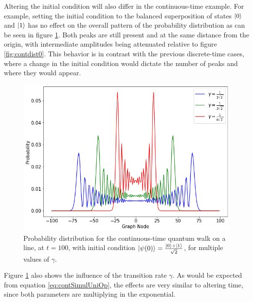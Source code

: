 \documentclass[../../dissertation.tex]{subfiles}
\begin{document}
Altering the initial condition will also differ in the
continuous-time example. For example, setting the initial condition to the
balanced superposition of states $\ket{0}$ and $\ket{1}$ has no effect on the
overall pattern of the probability distribution as can be seen in figure
\ref{fig:contdist2}. Both peaks are still present and at the same
distance from the origin, with intermediate amplitudes being attenuated
relative to figure \ref{fig:contdist0}. This behavior is in contrast with the previous
discrete-time cases, where a change in the initial condition would dictate the
number of peaks and where they would appear.
\begin{figure}[!h]
	\centering
	\includegraphics[scale=0.40]{img/ContQuantumWalk/ctqwMultipleGammaSup.png}
	\caption{Probability distribution for the continuous-time quantum walk on a line, at $t=100$, with initial condition $\ket{\psi(0)}=\frac{\ket{0}+\ket{1}}{\sqrt{2}}$, for multiple values of $\gamma$.} 
	\label{fig:contdist2}
\end{figure}
Figure \ref{fig:contdist2} also shows the influence of the transition rate
$\gamma$. As would be expected from equation \eqref{eq:contSimulUniOp}, the
effects are very similar to altering time, since both parameters are
multiplying in the exponential.\par
\end{document}
